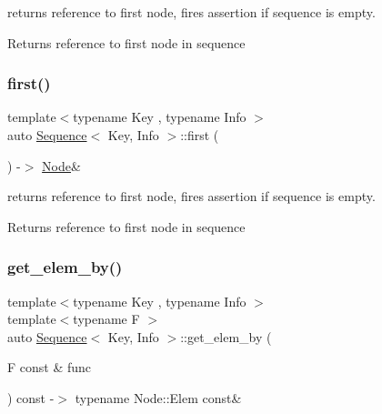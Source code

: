 returns reference to first node, fires assertion if sequence is empty. 

\begin{DoxyReturn}{Returns}
reference to first node in sequence 
\end{DoxyReturn}
\mbox{\label{structSequence_a0e44c4e84595f40ac01f827a25a9aa65}} 
\subsubsection{\texorpdfstring{first()}{first()}\hspace{0.1cm}{\footnotesize\ttfamily [2/2]}}
{\footnotesize\ttfamily template$<$typename Key , typename Info $>$ \\
auto \mbox{\hyperlink{structSequence}{Sequence}}$<$ Key, Info $>$\+::first (\begin{DoxyParamCaption}{ }\end{DoxyParamCaption}) -\/$>$ \mbox{\hyperlink{structSequence_1_1Node}{Node}}\& \hspace{0.3cm}{\ttfamily [inline]}}



returns reference to first node, fires assertion if sequence is empty. 

\begin{DoxyReturn}{Returns}
reference to first node in sequence 
\end{DoxyReturn}
\mbox{\label{structSequence_ae55f7babbaa36d26f1599b9d16d79134}} 
\subsubsection{\texorpdfstring{get\_elem\_by()}{get\_elem\_by()}\hspace{0.1cm}{\footnotesize\ttfamily [1/2]}}
{\footnotesize\ttfamily template$<$typename Key , typename Info $>$ \\
template$<$typename F $>$ \\
auto \mbox{\hyperlink{structSequence}{Sequence}}$<$ Key, Info $>$\+::get\+\_\+elem\+\_\+by (\begin{DoxyParamCaption}\item[{F const \&}]{func }\end{DoxyParamCaption}) const -\/$>$ typename Node\+::\+Elem const\& \hspace{0.3cm}{\ttfamily [inline]}}



